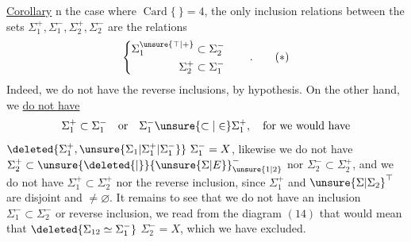 \begingroup\makeatletter\tagsleft@true\makeatother
\uline{Corollary} n the case where $\operatorname{Card}\{\ \}=4$,  the only inclusion relations between the sets $\Sigma_1^+,\Sigma_1^-,\Sigma_2^+,\Sigma_2^-$ are the relations
\[
\left\{\begin{aligned}
\Sigma_1^{\unsure{\top|+}}&\subset\Sigma_2^-\\
\Sigma_2^+&\subset\Sigma_1^-
\end{aligned}\right.\qquad .
\tag*{($*$)}
\]
Indeed, we do not have the reverse inclusions, by hypothesis. On the other hand, we \uline{do not have}
\[
\Sigma_1^+\subset\Sigma_1^-\quad\text{or}\quad
\Sigma_1^-\unsure{\subset|\in}\Sigma_1^+,\quad\text{for we would have}
\]
$\deleted{\Sigma_1^+,\unsure{\Sigma_1|\Sigma_1^+|\Sigma_1^-}}\ \Sigma_1^-=X$, likewise we do not have $\Sigma_2^+\subset\unsure{\deleted{\vert}}{\unsure{\Sigma|E}}_{\unsure{1|2}}^-$ nor $\Sigma_2^-\subset\Sigma_2^+$, and we do not have $\Sigma_1^+\subset\Sigma_2^+$ nor the reverse inclusion, since $\Sigma_1^+$ and $\unsure{\Sigma|\Sigma_2}^{\top}$ are disjoint and $\ne\varnothing$. It remains to see that we do not have an inclusion $\Sigma_1^-\subset\Sigma_2^-$ or reverse inclusion, we read from the diagram $(14)$ that   would mean that $\deleted{\Sigma_{12}\simeq\Sigma_1^-}$  $\Sigma_2^-=X$, which we have excluded.

